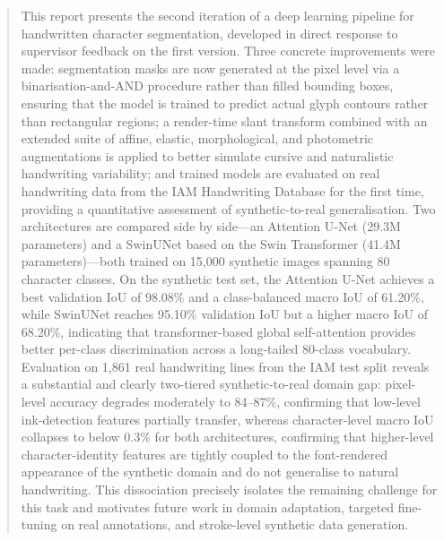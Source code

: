 \documentclass[a4paper,11pt]{article}
\begin{document}
\begin{abstract}
\noindent
This report presents the second iteration of a deep learning pipeline for handwritten
character segmentation, developed in direct response to supervisor feedback on the first
version. Three concrete improvements were made: segmentation masks are now generated at
the pixel level via a binarisation-and-AND procedure rather than filled bounding boxes,
ensuring that the model is trained to predict actual glyph contours rather than
rectangular regions; a render-time slant transform combined with an extended suite of
affine, elastic, morphological, and photometric augmentations is applied to better
simulate cursive and naturalistic handwriting variability; and trained models are
evaluated on real handwriting data from the IAM Handwriting Database for the first time,
providing a quantitative assessment of synthetic-to-real generalisation. Two architectures
are compared side by side---an Attention U-Net (29.3M parameters) and a SwinUNet based
on the Swin Transformer (41.4M parameters)---both trained on 15,000 synthetic images
spanning 80 character classes. On the synthetic test set, the Attention U-Net achieves a
best validation IoU of 98.08\% and a class-balanced macro IoU of 61.20\%, while SwinUNet
reaches 95.10\% validation IoU but a higher macro IoU of 68.20\%, indicating that
transformer-based global self-attention provides better per-class discrimination across a
long-tailed 80-class vocabulary. Evaluation on 1,861 real handwriting lines from the IAM
test split reveals a substantial and clearly two-tiered synthetic-to-real domain gap:
pixel-level accuracy degrades moderately to 84--87\%, confirming that low-level
ink-detection features partially transfer, whereas character-level macro IoU collapses to
below 0.3\% for both architectures, confirming that higher-level character-identity
features are tightly coupled to the font-rendered appearance of the synthetic domain and
do not generalise to natural handwriting. This dissociation precisely isolates the
remaining challenge for this task and motivates future work in domain adaptation, targeted
fine-tuning on real annotations, and stroke-level synthetic data generation.
\end{abstract}

\newpage
\tableofcontents
\newpage
\listoffigures
\listoftables
\newpage
\end{document}
